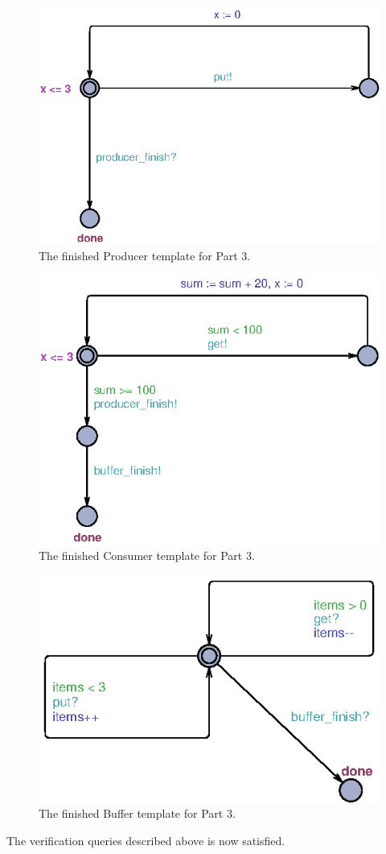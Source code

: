 \documentclass[a4paper,10pt]{article}
\begin{document}
\begin{figure}[h]
  \center
  \includegraphics{Part3ProducerFixed.eps}
  \caption{The finished Producer template for Part 3.}
  \label{img:part3producerFixed}
\end{figure}

\begin{figure}[h]
  \center
  \includegraphics{Part3ConsumerFixed.eps}
  \caption{The finished Consumer template for Part 3.}
  \label{img:part3consumerFixed}
\end{figure}

\begin{figure}[h]
  \center
  \includegraphics{Part3BufferFixed.eps}
  \caption{The finished Buffer template for Part 3.}
  \label{img:part3bufferFixed}
\end{figure}

The verification queries described above is now satisfied.
\end{document}
